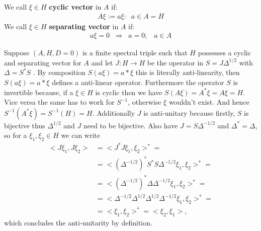 
\begin{definition}
    We call $\xi \in H$ \textbf{cyclic vector} in $A$ if:
    \begin{align}
        A\xi := { a\xi:\;\; a\in A} = H
    \end{align}
    We call $\xi \in H$ \textbf{separating vector} in $A$ if:
    \begin{align}
        a\xi = 0\;\; \Rightarrow \;\; a=0;\;\;\; a\in A
    \end{align}
\end{definition}
Suppose $(A, H, D = 0)$ is a finite spectral triple such that $H$ possesses a
cyclic and separating vector for $A$ and let $J: H \rightarrow H$ be the
operator in $S = J \Delta ^{1/2}$ with $\Delta = S^*S$ . By composition
$S(a\xi) = a*\xi$ this is literally anti-linearity, then $S(a \xi) = a* \xi$
defines a anti-linear operator. Furthermore the operator $S$ is invertible
because, if a $\xi \in H$ is cyclic then we have $S(A\xi) = A^*\xi = A\xi =
H$. Vice versa the same has to work for $S^{-1}$, otherwise $\xi$ wouldn't
exist. And hence $S^{-1}(A^*\xi) = S^{-1}(H) = H$. Additionally $J$ is
anti-unitary because firstly, $S$ is bijective thus $\Delta ^{1/2}$ and $J$ need to be bijective.
Also have $J = S \Delta^{-1/2}$ and $\Delta^* = \Delta$, so for a $\xi _1 ,
\xi _2 \in H$ we can write
\begin{align}
    <J \xi _1 , J \xi _2 > &= < J^*J\xi_1 , \xi_2>^* =\nonumber\\
    &= <(\Delta ^{-1/2})^* S^* S \Delta ^{-1/2} \xi_1, \xi_2>^* =\nonumber \\
    &= <(\Delta^{-1/2})^* \Delta \Delta^{-1/2} \xi_1, \xi_2>^* =\nonumber\\
    &= <\Delta^{-1/2} \Delta^{1/2}\Delta^{1/2} \Delta^{-1/2} \xi_1, \xi_2>^*
    =\nonumber\\
    &= <\xi _1, \xi_2>^* = <\xi_2 , \xi_1>,
\end{align}
which concludes the anti-unitarity by definition.
